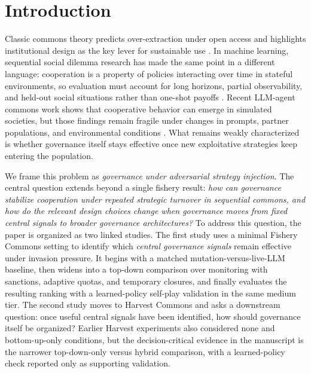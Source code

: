 \section{Introduction}

Classic commons theory predicts over-extraction under open access and highlights institutional design as the key lever for sustainable use \citep{gordon1954common,scott1955fishery,ostrom1990governing}. In machine learning, sequential social dilemma research has made the same point in a different language: cooperation is a property of policies interacting over time in stateful environments, so evaluation must account for long horizons, partial observability, and held-out social situations rather than one-shot payoffs \citep{leibo2017multiagent,meltingpot2021,du2023review,socialjax2025}. Recent LLM-agent commons work shows that cooperative behavior can emerge in simulated societies, but those findings remain fragile under changes in prompts, partner populations, and environmental conditions \citep{piatti2024cooperate,govsim_repo}. What remains weakly characterized is whether governance itself stays effective once new exploitative strategies keep entering the population.

We frame this problem as \emph{governance under adversarial strategy injection}. The central question extends beyond a single fishery result: \emph{how can governance stabilize cooperation under repeated strategic turnover in sequential commons, and how do the relevant design choices change when governance moves from fixed central signals to broader governance architectures?} To address this question, the paper is organized as two linked studies. The first study uses a minimal Fishery Commons setting to identify which \emph{central governance signals} remain effective under invasion pressure. It begins with a matched mutation-versus-live-LLM baseline, then widens into a top-down comparison over monitoring with sanctions, adaptive quotas, and temporary closures, and finally evaluates the resulting ranking with a learned-policy self-play validation in the same medium tier. The second study moves to Harvest Commons and asks a downstream question: once useful central signals have been identified, how should governance itself be organized? Earlier Harvest experiments also considered none and bottom-up-only conditions, but the decision-critical evidence in the manuscript is the narrower top-down-only versus hybrid comparison, with a learned-policy check reported only as supporting validation.

